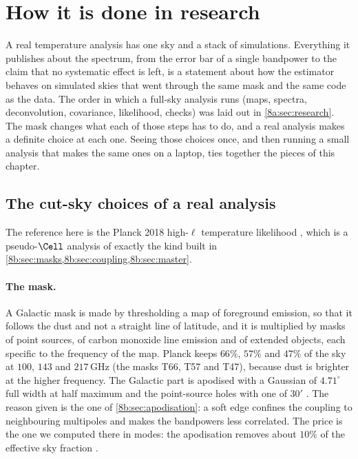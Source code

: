 \section{How it is done in research}
\label{8b:sec:research}

A real temperature analysis has one sky and a stack of simulations. Everything it publishes about the
spectrum, from the error bar of a single bandpower to the claim that no systematic effect is left,
is a statement about how the estimator behaves on simulated skies that went through the same mask
and the same code as the data. The order in which a full-sky analysis runs (maps, spectra,
deconvolution, covariance, likelihood, checks) was laid out in \cref{8a:sec:research}. The mask
changes what each of those steps has to do, and a real analysis makes a definite choice at each
one. Seeing those choices once, and then running a small analysis that makes the same ones on a
laptop, ties together the pieces of this chapter.

\subsection{The cut-sky choices of a real analysis}
\label{8b:sec:research-choices}

The reference here is the Planck 2018 high-$\ell$ temperature likelihood \cite{Planck2018V}, which is a
pseudo-$\Cell$ analysis of exactly the kind built in \cref{8b:sec:masks,8b:sec:coupling,8b:sec:master}.

\paragraph{The mask.}
A Galactic mask is made by thresholding a map of foreground emission, so that it follows the dust
and not a straight line of latitude, and it is multiplied by masks of point sources, of carbon
monoxide line emission and of extended objects, each specific to the frequency of the map. Planck
keeps $66\%$, $57\%$ and $47\%$ of the sky at $100$, $143$ and $217$\,GHz (the masks T66, T57 and T47), because
dust is brighter at the higher frequency. The Galactic part is apodised with a Gaussian of $4.71^\circ$
full width at half maximum and the point-source holes with one of $30'$ \cite[§3.2]{Planck2018V}. The
reason given is the one of \cref{8b:sec:apodisation}: a soft edge confines the coupling to neighbouring
multipoles and makes the bandpowers less correlated. The price is the one we computed there in modes:
the apodisation removes about $10\%$ of the effective sky fraction \cite[§3.2]{Planck2018V}.

